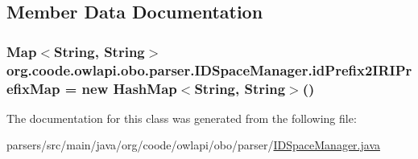\subsection{Member Data Documentation}
\hypertarget{classorg_1_1coode_1_1owlapi_1_1obo_1_1parser_1_1_i_d_space_manager_a20198478103c3e16aeaa3264ddf9e800}{
\subsubsection[{id\-Prefix2\-I\-R\-I\-Prefix\-Map}]{\setlength{\rightskip}{0pt plus 5cm}Map$<$String, String$>$ org.\-coode.\-owlapi.\-obo.\-parser.\-I\-D\-Space\-Manager.\-id\-Prefix2\-I\-R\-I\-Prefix\-Map = new Hash\-Map$<$String, String$>$()\hspace{0.3cm}{\ttfamily [private]}}}\label{classorg_1_1coode_1_1owlapi_1_1obo_1_1parser_1_1_i_d_space_manager_a20198478103c3e16aeaa3264ddf9e800}


The documentation for this class was generated from the following file\-:\begin{DoxyCompactItemize}
\item 
parsers/src/main/java/org/coode/owlapi/obo/parser/\hyperlink{_i_d_space_manager_8java}{I\-D\-Space\-Manager.\-java}\end{DoxyCompactItemize}
